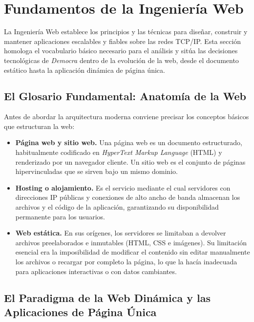 \section{Fundamentos de la Ingeniería Web}

La Ingeniería Web establece los principios y las técnicas para diseñar, construir y
mantener aplicaciones escalables y fiables sobre las redes TCP/IP. Esta sección
homologa el vocabulario básico necesario para el análisis y sitúa las decisiones
tecnológicas de \textit{Democra} dentro de la evolución de la web, desde el
documento estático hasta la aplicación dinámica de página única.

\subsection{El Glosario Fundamental: Anatomía de la Web}

Antes de abordar la arquitectura moderna conviene precisar los conceptos básicos que
estructuran la web:

\begin{itemize}
    \item \textbf{Página web y sitio web.} Una página web es un documento
    estructurado, habitualmente codificado en \textit{HyperText Markup Language}
    (HTML) y renderizado por un navegador cliente. Un sitio web es el conjunto de
    páginas hipervinculadas que se sirven bajo un mismo dominio.

    \item \textbf{Hosting o alojamiento.} Es el servicio mediante el cual servidores
    con direcciones IP públicas y conexiones de alto ancho de banda almacenan los
    archivos y el código de la aplicación, garantizando su disponibilidad
    permanente para los usuarios.

    \item \textbf{Web estática.} En sus orígenes, los servidores se limitaban a
    devolver archivos preelaborados e inmutables (HTML, CSS e imágenes). Su
    limitación esencial era la imposibilidad de modificar el contenido sin editar
    manualmente los archivos o recargar por completo la página, lo que la hacía
    inadecuada para aplicaciones interactivas o con datos cambiantes.
\end{itemize}

\subsection{El Paradigma de la Web Dinámica y las Aplicaciones de Página Única}

